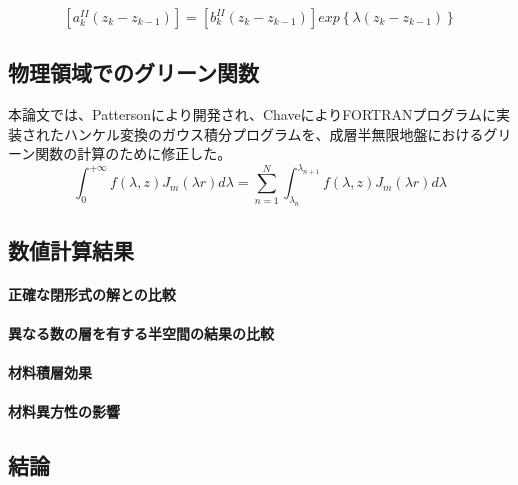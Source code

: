 \[\left[a_{k}^{II}\left(z_{k}-z_{k-1}\right)\right]=\left[b_{k}^{II}\left(z_{k}-z_{k-1}\right)\right]exp\left\{ \lambda\left(z_{k}-z_{k-1}\right)\right\}\]

\subsection{物理領域でのグリーン関数}

本論文では、Pattersonにより開発され、ChaveによりFORTRANプログラムに実装されたハンケル変換のガウス積分プログラムを、成層半無限地盤におけるグリーン関数の計算のために修正した。
\[\int_{0}^{+\infty}f\left(\lambda,z\right)J_{m}\left(\lambda r\right)d\lambda=\sum_{n=1}^{N}\int_{\lambda_{n}}^{\lambda_{n+1}}f\left(\lambda,z\right)J_{m}\left(\lambda r\right)d\lambda\]

\subsection{数値計算結果}

\paragraph{正確な閉形式の解との比較}

\paragraph{異なる数の層を有する半空間の結果の比較}

\paragraph{材料積層効果}

\paragraph{材料異方性の影響}

\subsection{結論}

